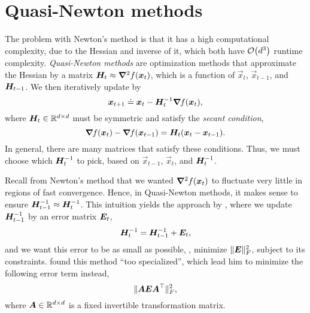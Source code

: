 \section{Quasi-Newton methods}

The problem with Newton's method is that it has a high computational complexity, due to the Hessian
and inverse of it, which both have $\bigo{d^3}$ runtime complexity. \textit{Quasi-Newton methods}
are optimization methods that approximate the Hessian by a matrix $\bm{H}_t \approx
    \bm{\nabla}^2_{\! } f(\bm{x}_t)$, which is a function of $\vec{x}_t$, $\vec{x}_{t-1}$, and $\bm{H}_{t-1}$.
We then iteratively update by \[
    \bm{x}_{t+1} \doteq \bm{x}_t - \bm{H}^{-1}_t \bm{\nabla}_{\! } f(\bm{x}_t),
\]
where $\bm{H}_t \in \mathbb{R}^{d\times d}$ must be symmetric and satisfy the \textit{secant condition}, \[
    \bm{\nabla}_{\! } f(\bm{x}_t) - \bm{\nabla}_{\! } f(\bm{x}_{t-1}) = \bm{H}_t (\bm{x}_t - \bm{x}_{t-1}).
\]
In general, there are many matrices that satisfy these conditions. Thus, we must choose which
$\bm{H}^{-1}_t$ to pick, based on $\vec{x}_{t-1}$, $\vec{x}_t$, and
$\bm{H}^{-1}_t$.

Recall from Newton's method that we wanted $\bm{\nabla}^2_{\! } f(\bm{x}_t)$ to fluctuate very little in
regions of fast convergence. Hence, in Quasi-Newton methods, it makes sense to ensure
$\bm{H}^{-1}_{t-1} \approx \bm{H}^{-1}_t$. This intuition yields the approach by
\cite{greenstadt1970variations}, where we update $\bm{H}^{-1}_{t-1}$ by an error matrix
$\bm{E}_t$, \[
    \bm{H}^{-1}_t = \bm{H}^{-1}_{t-1} + \bm{E}_t,
\]
and we want this error to be as small as possible, \ie, minimize $\| \bm{E} \|_F^2$, subject to
its constraints. \cite{greenstadt1970variations} found this method ``too specialized'', which lead
him to minimize the following error term instead, \[
    \| \bm{A} \bm{E} \bm{A}^\top \|_F^2,
\]
where $\bm{A} \in \mathbb{R}^{d\times d}$ is a fixed invertible transformation matrix.

